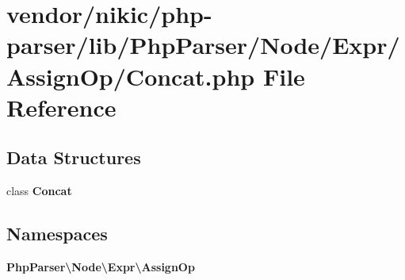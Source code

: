 \section{vendor/nikic/php-\/parser/lib/\+Php\+Parser/\+Node/\+Expr/\+Assign\+Op/\+Concat.php File Reference}
\label{_assign_op_2_concat_8php}
\subsection*{Data Structures}
\begin{DoxyCompactItemize}
\item 
class {\bf Concat}
\end{DoxyCompactItemize}
\subsection*{Namespaces}
\begin{DoxyCompactItemize}
\item 
 {\bf Php\+Parser\textbackslash{}\+Node\textbackslash{}\+Expr\textbackslash{}\+Assign\+Op}
\end{DoxyCompactItemize}
